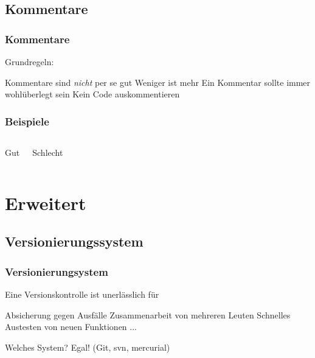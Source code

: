 \documentclass{beamer}
\begin{document}
\subsection{Kommentare}
\begin{frame}
    \frametitle{Kommentare}
    Grundregeln:

    \begin{outline}
        \pause
        \1 Kommentare sind \emph{nicht} per se gut
        \pause
        \1 Weniger ist mehr
        \pause
        \1 Ein Kommentar sollte immer wohlüberlegt sein
        \pause
        \1 Kein Code auskommentieren
    \end{outline}
\end{frame}
\begin{frame}
    \frametitle{Beispiele}
    \begin{columns}[t]
        \begin{center}
            \huge \color{green} Gut
        \end{center}
        \begin{center}
            \huge \color{red} Schlecht
        \end{center}
    \end{columns}
\end{frame}

\section{Erweitert}
\begin{frame}
    \tableofcontents[currentsection]
\end{frame}
\subsection{Versionierungssystem}
\begin{frame}
    \frametitle{Versionierungsystem}

    Eine Versionskontrolle ist unerlässlich für
    \begin{outline}
        \1 Absicherung gegen Ausfälle
        \1 Zusammenarbeit von mehreren Leuten
        \1 Schnelles Austesten von neuen Funktionen
        \1 ...
    \end{outline} \pause

    \vspace{2em}Welches System?\hspace{3em}
    \pause 
    Egal! (Git, svn, mercurial)
\end{frame}
\end{document}
